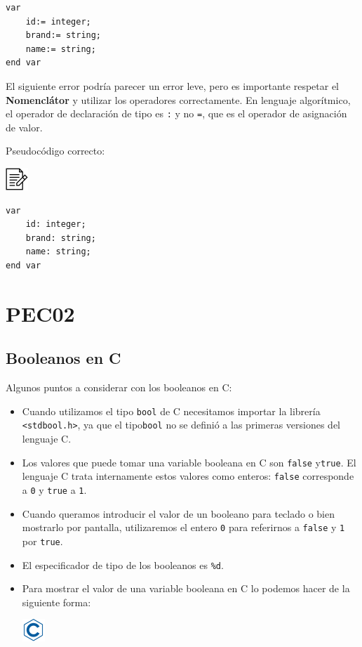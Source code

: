 \documentclass[
]{book}
\providecommand{\tightlist}{%
  \setlength{\itemsep}{0pt}\setlength{\parskip}{0pt}}
\begin{document}
\begin{verbatim}
var
    id:= integer;
    brand:= string;
    name:= string;
end var
\end{verbatim}

El siguiente error podría parecer un error leve, pero es importante respetar el \textbf{Nomenclátor} y utilizar los operadores correctamente. En lenguaje algorítmico, el operador de declaración de tipo es \texttt{:} y no \texttt{=}, que es el operador de asignación de valor.

Pseudocódigo correcto:

\includegraphics{./img/alg.png}

\begin{verbatim}
var
    id: integer;
    brand: string;
    name: string;
end var
\end{verbatim}

\hypertarget{pec02}{%
\chapter{PEC02}\label{pec02}}

\hypertarget{booleanos-en-c}{%
\section{Booleanos en C}\label{booleanos-en-c}}

Algunos puntos a considerar con los booleanos en C:

\begin{itemize}
\tightlist
\item
  Cuando utilizamos el tipo \texttt{bool} de C necesitamos importar la librería \texttt{\textless{}stdbool.h\textgreater{}}, ya que el tipo\texttt{bool} no se definió a las primeras versiones del lenguaje C.
\item
  Los valores que puede tomar una variable booleana en C son \texttt{false} y\texttt{true}. El lenguaje C trata internamente estos valores como enteros: \texttt{false} corresponde a \texttt{0} y \texttt{true} a \texttt{1}.
\item
  Cuando queramos introducir el valor de un booleano para teclado o bien mostrarlo por pantalla, utilizaremos el entero \texttt{0} para referirnos a \texttt{false} y \texttt{1} por \texttt{true}.
\item
  El especificador de tipo de los booleanos es \texttt{\%d}.
\item
  Para mostrar el valor de una variable booleana en C lo podemos hacer de la siguiente forma:

  \includegraphics{./img/c.png}
\end{itemize}
\end{document}
